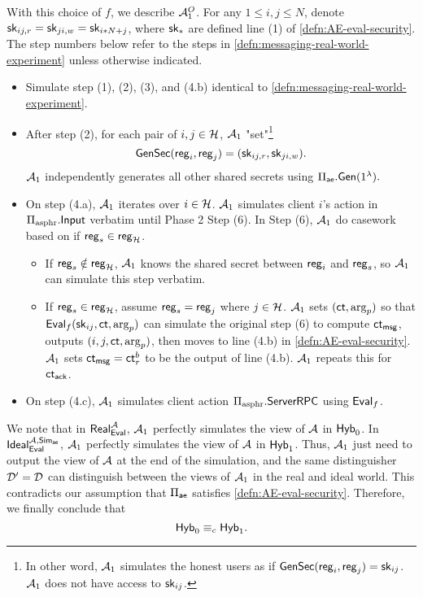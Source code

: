 With this choice of $f$, we describe $\mathcal{A}_1^O$. For any $1 \leq i, j \leq N$, denote ${\mathsf{sk}}_{ij, r} = {\mathsf{sk}}_{ji, w} = {\mathsf{sk}}_{i * N + j}$, where ${\mathsf{sk}}_{*}$ are defined line (1) of \cref{defn:AE-eval-security}. The step numbers below refer to the steps in \cref{defn:messaging-real-world-experiment} unless otherwise indicated. 
\begin{itemize}
    \item Simulate step (1), (2), (3), and (4.b) identical to \cref{defn:messaging-real-world-experiment}.
    \item After step (2), for each pair of $i, j \in \mathcal{H}$, $\mathcal{A}_1$ "set"\footnote{In other word, $\mathcal{A}_1$ simulates the honest users as if $\mathsf{GenSec}(\mathsf{reg}_i, \mathsf{reg}_j) = {\mathsf{sk}}_{ij}$. $\mathcal{A}_1$ does not have access to ${\mathsf{sk}}_{ij}$.} 
    $$\mathsf{GenSec}(\mathsf{reg}_i, \mathsf{reg}_j) = ({\mathsf{sk}}_{ij, r}, {\mathsf{sk}}_{ji, w}).$$ 
    $\mathcal{A}_1$ independently generates all other shared secrets using $\Pi_{\mathsf{ae}}.\mathsf{Gen}(1^{\lambda}).$
    \item On step (4.a), $\mathcal{A}_1$ iterates over $i \in \mathcal{H}$. $\mathcal{A}_1$ simulates client $i$'s action in $\Pi_{\text{asphr}}.\mathsf{Input}$ verbatim until Phase 2 Step (6). In Step (6), $\mathcal{A}_1$ do casework based on if $\mathsf{reg}_s \in \mathsf{reg}_{\mathcal{H}}$. 
    \begin{itemize}
        \item  If $\mathsf{reg}_s \notin \mathsf{reg}_{\mathcal{H}}$, $\mathcal{A}_1$ knows the shared secret between $\mathsf{reg}_i$ and $\mathsf{reg}_s$, so $\mathcal{A}_1$ can simulate this step verbatim.
        \item  If $\mathsf{reg}_s \in \mathsf{reg}_{\mathcal{H}}$, assume $\mathsf{reg}_s = \mathsf{reg}_j$ where $j \in \mathcal{H}$. $\mathcal{A}_1$ sets $(\mathsf{ct}, \arg_p)$ so that $\mathsf{Eval}_f({\mathsf{sk}}_{ij}, \mathsf{ct}, \arg_p)$ can simulate the original step (6) to compute $\mathsf{ct}_{\mathsf{msg}}$, outputs $(i, j, \mathsf{ct}, \arg_p)$, then moves to line (4.b) in \cref{defn:AE-eval-security}. $\mathcal{A}_1$ sets $\mathsf{ct}_{\mathsf{msg}} = \mathsf{ct}^b_r$ to be the output of line (4.b). $\mathcal{A}_1$ repeats this for $\mathsf{ct}_{\mathsf{ack}}$.
    \end{itemize}
   
    \item On step (4.c), $\mathcal{A}_1$ simulates client action $\Pi_{\text{asphr}}.\mathsf{ServerRPC}$ using $\mathsf{Eval}_f$.
\end{itemize}
We note that in $\mathsf{Real}_{\mathsf{Eval}}^{\mathcal{A}}$, $\mathcal{A}_1$ perfectly simulates the view of $\mathcal{A}$ in $\mathsf{Hyb}_0$. In $\mathsf{Ideal}_{\mathsf{Eval}}^{\mathcal{A}, \mathsf{Sim}_{\mathsf{ae}}}$, $\mathcal{A}_1$ perfectly simulates the view of $\mathcal{A}$ in $\mathsf{Hyb}_1$. Thus, $\mathcal{A}_1$ just need to output the view of $\mathcal{A}$ at the end of the simulation, and the same distinguisher $\mathcal{D}' = \mathcal{D}$ can distinguish between the views of $\mathcal{A}_1$ in the real and ideal world. This contradicts our assumption that $\Pi_{\mathsf{ae}}$ satisfies \cref{defn:AE-eval-security}. Therefore, we finally conclude that
$$\mathsf{Hyb}_0 \equiv_c \mathsf{Hyb}_1.$$

